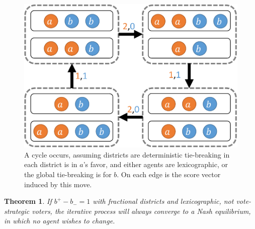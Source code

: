 \documentclass[letterpaper]{article} %
\newtheorem{theorem}{Theorem}
\begin{document}
\begin{figure}
	\centering
	\includegraphics[width=0.7\columnwidth]{cycle_1.pdf}
	\caption{A cycle occurs, assuming districts are deterministic tie-breaking in each district is in $a$'s favor, and either agents are lexicographic, or the global tie-breaking is for $b$. On each edge is the score vector induced by this move.}
	\label{fig:cycle1}
\end{figure}
\begin{theorem}\label{lexiFracConverge}
	If $b^{+}-b_{-}=1$ with fractional districts and lexicographic, not vote-strategic voters, the iterative process will always converge to a Nash equilibrium, in which no agent wishes to change.\end{theorem}
\end{document}
